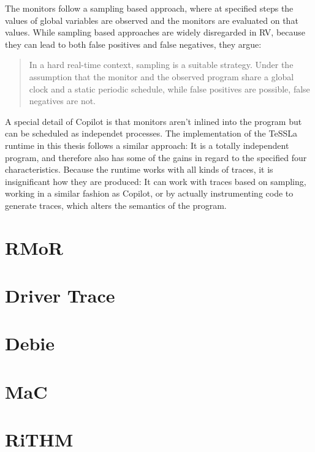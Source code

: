 The monitors follow a sampling based approach, where at specified steps the values of global variables are observed and the monitors are evaluated
on that values.
While sampling based approaches are widely disregarded in RV, because they can lead to both false positives and false negatives,
they argue:

\begin{quote}
  In a hard real-time context, sampling is a suitable strategy. Under
  the assumption that the monitor and the observed program share a global clock and a static periodic schedule, while false positives are possible, false negatives are not.~\cite{Pike2010}
\end{quote}

A special detail of Copilot is that monitors aren't inlined into the program but can be scheduled as independet processes.
The implementation of the TeSSLa runtime in this thesis follows a similar approach: It is a totally independent program,
and therefore also has some of the gains in regard to the specified four characteristics.
Because the runtime works with all kinds of traces, it is insignificant how they are produced:
It can work with traces based on sampling, working in a similar fashion as Copilot, or by actually instrumenting code to generate
traces, which alters the semantics of the program.


\section{RMoR}
\label{sec:related:rmor}

\section{Driver Trace}
\section{Debie}
\section{MaC}
\section{RiTHM}


